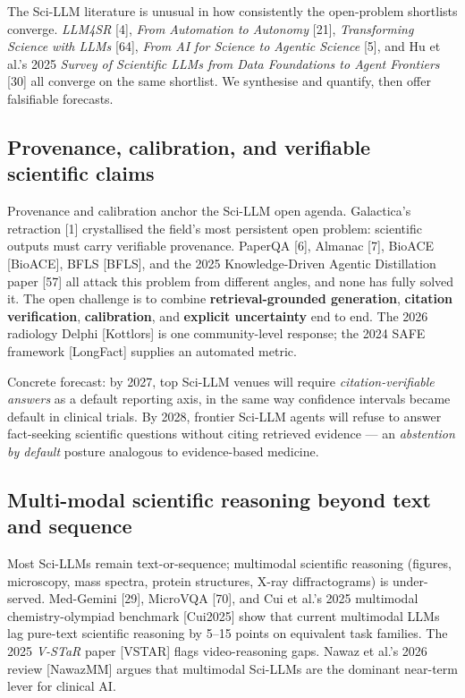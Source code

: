 The Sci-LLM literature is unusual in how consistently the open-problem shortlists converge. \emph{LLM4SR} {[}4{]}, \emph{From Automation to Autonomy} {[}21{]}, \emph{Transforming Science with LLMs} {[}64{]}, \emph{From AI for Science to Agentic Science} {[}5{]}, and Hu et al.'s 2025 \emph{Survey of Scientific LLMs from Data Foundations to Agent Frontiers} {[}30{]} all converge on the same shortlist. We synthesise and quantify, then offer falsifiable forecasts.

\subsection{Provenance, calibration, and verifiable scientific claims}\label{provenance-calibration-and-verifiable-scientific-claims}

Provenance and calibration anchor the Sci-LLM open agenda. Galactica's retraction {[}1{]} crystallised the field's most persistent open problem: scientific outputs must carry verifiable provenance. PaperQA {[}6{]}, Almanac {[}7{]}, BioACE {[}BioACE{]}, BFLS {[}BFLS{]}, and the 2025 Knowledge-Driven Agentic Distillation paper {[}57{]} all attack this problem from different angles, and none has fully solved it. The open challenge is to combine \textbf{retrieval-grounded generation}, \textbf{citation verification}, \textbf{calibration}, and \textbf{explicit uncertainty} end to end. The 2026 radiology Delphi {[}Kottlors{]} is one community-level response; the 2024 SAFE framework {[}LongFact{]} supplies an automated metric.

Concrete forecast: by 2027, top Sci-LLM venues will require \emph{citation-verifiable answers} as a default reporting axis, in the same way confidence intervals became default in clinical trials. By 2028, frontier Sci-LLM agents will refuse to answer fact-seeking scientific questions without citing retrieved evidence --- an \emph{abstention by default} posture analogous to evidence-based medicine.

\subsection{Multi-modal scientific reasoning beyond text and sequence}\label{multi-modal-scientific-reasoning-beyond-text-and-sequence}

Most Sci-LLMs remain text-or-sequence; multimodal scientific reasoning (figures, microscopy, mass spectra, protein structures, X-ray diffractograms) is under-served. Med-Gemini {[}29{]}, MicroVQA {[}70{]}, and Cui et al.'s 2025 multimodal chemistry-olympiad benchmark {[}Cui2025{]} show that current multimodal LLMs lag pure-text scientific reasoning by 5--15 points on equivalent task families. The 2025 \emph{V-STaR} paper {[}VSTAR{]} flags video-reasoning gaps. Nawaz et al.'s 2026 review {[}NawazMM{]} argues that multimodal Sci-LLMs are the dominant near-term lever for clinical AI.

